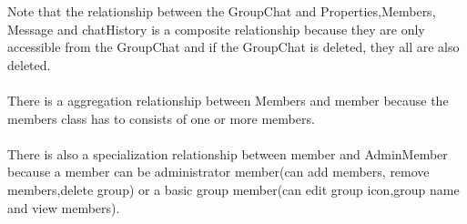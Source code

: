 \documentclass[a4paper]{article}
\begin{document}
Note that the relationship between the GroupChat and Properties,Members, Message and chatHistory is a composite relationship because they are only accessible from the GroupChat and if the GroupChat is deleted, they all are also deleted.\\
\\
There is a aggregation relationship between Members and member because the members class has to consists of one or more members. \\
\\
There is also a specialization relationship between member and AdminMember because a member can be administrator member(can add members, remove members,delete group) or a basic group member(can edit group icon,group name and view members).
\end{document}
